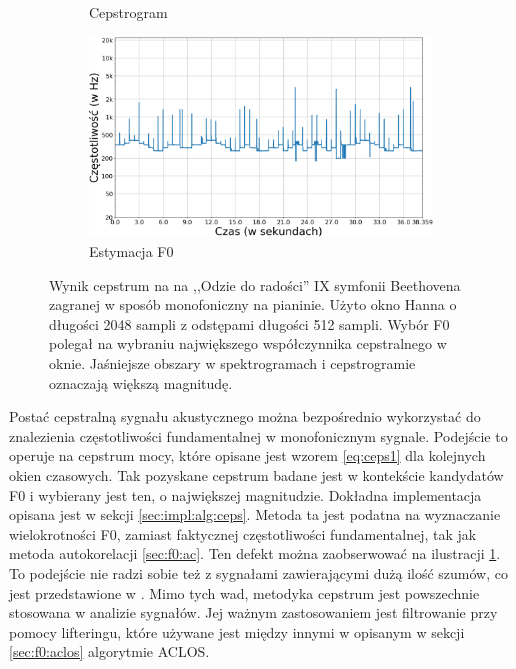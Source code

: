 \documentclass[12pt,a4paper,twoside]{mwart}
\begin{document}
\begin{figure}[t]
\begin{subfigure}{.49\textwidth}
    \caption{Cepstrogram}
  \end{subfigure}
  \begin{subfigure}{.5\textwidth}
    \centering
    \includegraphics[width=1.\linewidth]{images/Cepstrum/estymacjaF0_cropped.png}
    \caption{Estymacja F0}
  \end{subfigure}
  \caption{Wynik cepstrum na na ,,Odzie do radości'' IX symfonii Beethovena zagranej w sposób monofoniczny na pianinie. Użyto okno Hanna o długości 2048 sampli z odstępami długości 512 sampli. Wybór F0 polegał na wybraniu największego współczynnika cepstralnego w oknie. Jaśniejsze obszary w spektrogramach i cepstrogramie oznaczają większą magnitudę.}
  \label{fig:cepstrumF0}
\end{figure}

Postać cepstralną sygnału akustycznego można bezpośrednio wykorzystać do znalezienia częstotliwości fundamentalnej w monofonicznym sygnale. Podejście to operuje na cepstrum mocy, które opisane jest wzorem \ref{eq:ceps1} dla kolejnych okien czasowych. Tak pozyskane cepstrum badane jest w kontekście kandydatów F0 i wybierany jest ten, o największej magnitudzie. Dokładna implementacja opisana jest w sekcji \ref{sec:impl:alg:ceps}. Metoda ta jest podatna na wyznaczanie wielokrotności F0, zamiast faktycznej częstotliwości fundamentalnej, tak jak metoda autokorelacji \ref{sec:f0:ac}. Ten defekt można zaobserwować na ilustracji \ref{fig:cepstrumF0}. To podejście nie radzi sobie też z sygnałami zawierającymi dużą ilość szumów, co jest przedstawione w 
\cite[233-235]{Transcription:Kunieda:Aclos}
. Mimo tych wad, metodyka cepstrum jest powszechnie stosowana w analizie sygnałów. Jej ważnym zastosowaniem jest filtrowanie przy pomocy lifteringu, które używane jest między innymi w opisanym w sekcji \ref{sec:f0:aclos} algorytmie ACLOS.
\end{document}
